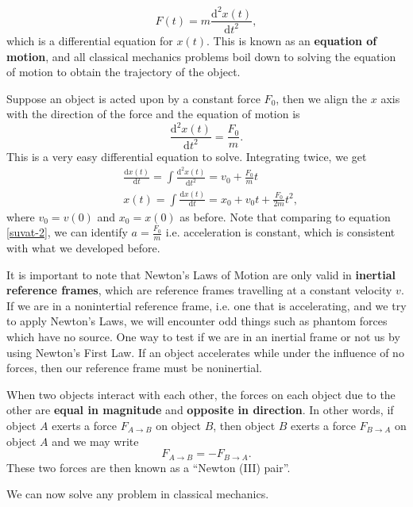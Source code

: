 \documentclass[../newtonian_mechanics.tex]{subfiles}
\begin{document}
        \begin{equation}
            F(t)=m\frac{\mathrm{d}^2x(t)}{\mathrm{d}t^2},
        \end{equation}
        which is a differential equation for $x(t)$. This is known as an \textbf{equation of motion}, and all classical mechanics problems boil down to solving the equation of motion to obtain the trajectory of the object.
        \begin{example}
            Suppose an object is acted upon by a constant force $F_0$, then we align the $x$ axis with the direction of the force and the equation of motion is
            \begin{equation*}
                \frac{\mathrm{d}^2x(t)}{\mathrm{d}t^2}=\frac{F_0}{m}.
            \end{equation*}
            This is a very easy differential equation to solve. Integrating twice, we get
            \begin{align*}
                &\frac{\mathrm{d}x(t)}{\mathrm{d}t}=\int\frac{\mathrm{d}^2x(t)}{\mathrm{d}t^2}=v_0+\frac{F_0}{m}t\\
                &x(t)=\int\frac{\mathrm{d}x(t)}{\mathrm{d}t}=x_0+v_0t+\frac{F_0}{2m}t^2,
            \end{align*}
            where $v_0=v(0)$ and $x_0=x(0)$ as before. Note that comparing to equation \ref{suvat-2}, we can identify $a=\frac{F_0}{m}$ i.e. acceleration is constant, which is consistent with what we developed before.
        \end{example}
        It is important to note that Newton's Laws of Motion are only valid in \textbf{inertial reference frames}, which are reference frames travelling at a constant velocity $v$. If we are in a nonintertial reference frame, i.e. one that is accelerating, and we try to apply Newton's Laws, we will encounter odd things such as phantom forces which have no source. One way to test if we are in an inertial frame or not us by using Newton's First Law. If an object accelerates while under the influence of no forces, then our reference frame must be noninertial.
        \begin{definition}
            When two objects interact with each other, the forces on each object due to the other are \textbf{equal in magnitude} and \textbf{opposite in direction}. In other words, if object $A$ exerts a force $F_{A\to B}$ on object $B$, then object $B$ exerts a force $F_{B\to A}$ on object $A$ and we may write
            \begin{equation}
                F_{A\to B}=-F_{B\to A}.
            \end{equation}
            These two forces are then known as a ``Newton (III) pair''.
        \end{definition}
        We can now solve any problem in classical mechanics.
\end{document}
